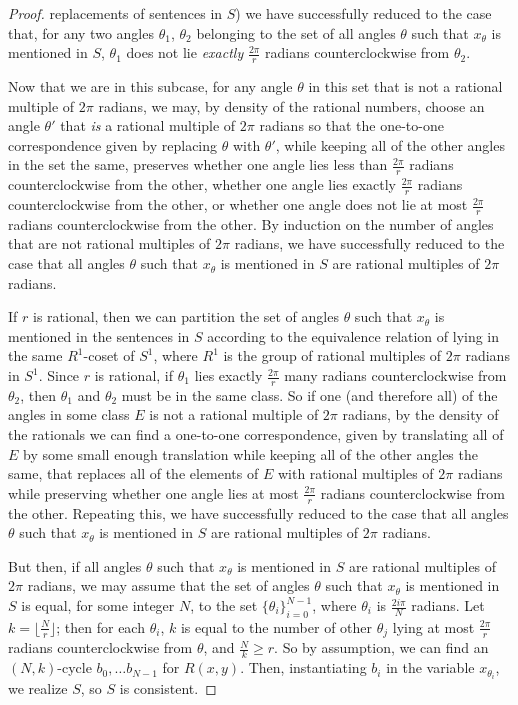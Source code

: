 \documentclass{amsart}
\theoremstyle{definition}
\theoremstyle{remark}
\numberwithin{equation}{section}
\begin{document}
\begin{proof}
replacements of sentences in $S$) we have successfully reduced to the case that, for any two angles $\theta_{1}$, $\theta_{2}$ belonging to the set of all angles $\theta$ such that $x_{\theta}$ is mentioned in $S$, $\theta_{1}$ does not lie \textit{exactly} $\frac{2\pi}{r}$ radians counterclockwise from $\theta_{2}$.
    
    Now that we are in this subcase, for any angle $\theta$ in this set that is not a rational multiple of $2\pi$ radians, we may, by density of the rational numbers, choose an angle $\theta'$ that \textit{is} a rational multiple of $2\pi$ radians so that the one-to-one correspondence given by replacing $\theta$ with $\theta'$, while keeping all of the other angles in the set the same, preserves whether one angle lies less than $\frac{2\pi}{r}$ radians counterclockwise from the other, whether one angle lies exactly $\frac{2\pi}{r}$ radians counterclockwise from the other, or whether one angle does not lie at most $\frac{2\pi}{r}$ radians counterclockwise from the other. By induction on the number of angles that are not rational multiples of $2\pi$ radians, we have successfully reduced to the case that all angles $\theta$ such that $x_{\theta}$ is mentioned in $S$ are rational multiples of $2\pi$ radians.

    If $r$ is rational, then we can partition the set of angles $\theta$ such that $x_{\theta}$ is mentioned in the sentences in $S$ according to the equivalence relation of lying in the same $R^{1}$-coset of $S^{1}$, where $R^{1}$ is the group of rational multiples of $2\pi$ radians in $S^{1}$. Since $r$ is rational, if $\theta_{1}$ lies exactly $\frac{2\pi}{r}$ many radians counterclockwise from $\theta_{2}$, then $\theta_{1}$ and $\theta_{2}$ must be in the same class. So if one (and therefore all) of the angles in some class $E$ is not a rational multiple of $2\pi$ radians, by the density of the rationals we can find a one-to-one correspondence, given by translating all of $E$ by some small enough translation while keeping all of the other angles the same, that replaces all of the elements of $E$ with rational multiples of $2\pi$ radians while preserving whether one angle lies at most $\frac{2\pi}{r}$ radians counterclockwise from the other. Repeating this, we have successfully reduced to the case that all angles $\theta$ such that $x_{\theta}$ is mentioned in $S$ are rational multiples of $2\pi$ radians.

    But then, if all angles $\theta$ such that $x_{\theta}$ is mentioned in $S$ are rational multiples of $2\pi$ radians, we may assume that the set of angles $\theta$ such that $x_{\theta}$ is mentioned in $S$ is equal, for some integer $N$, to the set $\{\theta_{i}\}^{N-1}_{i = 0}$, where $\theta_{i}$ is $\frac{2i\pi}{N}$ radians. Let $k = \lfloor \frac{N}{r} \rfloor$; then for each $\theta_{i}$, $k$ is equal to the number of other $\theta_{j}$ lying at most $\frac{2\pi}{r}$ radians counterclockwise from $\theta$, and $\frac{N}{k} \geq r$. So by assumption, we can find an $(N, k)$-cycle $b_{0}, \ldots b_{N-1}$ for $R(x, y)$. Then, instantiating $b_{i}$ in the variable $x_{\theta_{i}}$, we realize $S$, so $S$ is consistent.
\end{proof}
\end{document}
